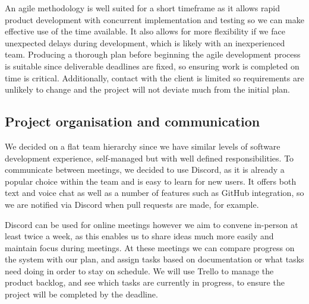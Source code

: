 \documentclass[10pt]{article}
\begin{document}
An agile methodology is well suited for a short timeframe \cite{agileSpeed} as
it allows rapid product development with concurrent implementation and testing
so we can make effective use of the time available. It also allows for more
flexibility if we face unexpected delays during development, which is likely
with an inexperienced team. Producing a thorough plan before beginning the agile
development process is suitable since deliverable deadlines are fixed, so
ensuring work is completed on time is critical. Additionally, contact with the
client is limited so requirements are unlikely to change and the project will
not deviate much from the initial plan.


\subsection{Project organisation and communication}
We decided on a flat team hierarchy since we have similar levels of software
development experience, self-managed but with well defined responsibilities. To
communicate between meetings, we decided to use Discord, as it is already a
popular choice within the team and is easy to learn for new users. It offers
both text and voice chat as well as a number of features such as GitHub
integration, so we are notified via Discord when pull requests are made, for
example.

Discord can be used for online meetings however we aim to convene in-person at
least twice a week, as this enables us to share ideas much more easily and
maintain focus during meetings. At these meetings we can compare progress on the
system with our plan, and assign tasks based on documentation or what tasks need
doing in order to stay on schedule. We will use Trello to manage the product
backlog, and see which tasks are currently in progress, to ensure the project
will be completed by the deadline.
\end{document}
